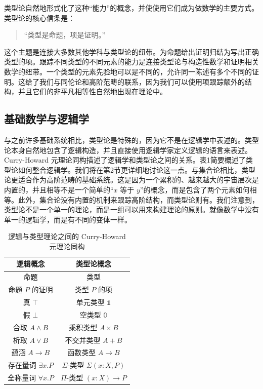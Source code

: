 \documentclass{ctexrep}
\theoremstyle{plain}
\theoremstyle{definition}
\theoremstyle{remark}
\theoremstyle{definition}
\theoremstyle{definition}
\theoremstyle{definition}
\begin{document}
类型论自然地形式化了这种“能力”的概念，并使使用它们成为做数学的主要方式。类型论的核心信条是：

\begin{quotation}“类型是命题，项是证明。”\end{quotation}

这个主题是连接大多数其他学科与类型论的纽带。为命题给出证明归结为写出正确类型的项。跟踪不同类型的不同元素的能力是连接类型论与构造性数学和证明相关数学的纽带。一个类型的元素先验地可以是不同的，允许同一陈述有多个不同的证明。这给了我们与同伦论和高阶范畴的联系，因为我们可以使用项跟踪额外的结构，并且它们的非平凡相等性自然地出现在理论中。

\subsection{基础数学与逻辑学}

与之前许多基础系统相比，类型论是特殊的，因为它不是在逻辑学中表述的。类型论本身自然地包含了逻辑构造，并且直接使用逻辑学家定义逻辑的语言来表述。Curry-Howard 元理论同构描述了逻辑学和类型论之间的关系。表1简要概述了类型论如何整合逻辑学。我们将在第2节更详细地讨论这一点。与集合论相比，类型论更适合作为高阶范畴的基础系统。这是因为一个累积的、越来越大的宇宙层次是内置的，并且相等不是一个简单的“$x$ 等于 $y$”的概念，而是包含了两个元素如何相等。此外，集合论没有内置的机制来跟踪高阶结构，而类型论则有。我们注意到，类型论不是一个单一的理论，而是一组可以用来构建理论的原则。就像数学中没有单一的逻辑学，而是有不同的变体一样。

\begin{table}[htbp]
\centering
\renewcommand{\arraystretch}{1.3} %
\begin{tabular}{|c|c|}
\hline
\textbf{逻辑概念} & \textbf{类型论概念} \\
\hline
命题 & 类型 \\
\hline
命题 $P$ 的证明 & 类型 $P$ 的项 \\
\hline
真 $\top$ & 单元类型 $\mathbb{1}$ \\
\hline
假 $\bot$ & 空类型 $\mathbb{0}$ \\
\hline
合取 $A \land B$ & 乘积类型 $A \times B$ \\
\hline
析取 $A \lor B$ & 不交并类型 $A + B$ \\
\hline
蕴涵 $A \to B$ & 函数类型 $A \to B$ \\
\hline
存在量词 $\exists x.P$ & $\Sigma$-类型 $\Sigma(x : X, P)$ \\
\hline
全称量词 $\forall x.P$ & $\Pi$-类型 $(x : X) \to P$ \\
\hline
\end{tabular}
\caption{逻辑与类型理论之间的 Curry-Howard 元理论同构}
\end{table}
\end{document}
